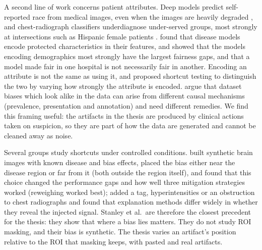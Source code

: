 \documentclass[11pt,a4paper]{article}
\begin{document}
A second line of work concerns patient attributes. Deep models predict self-reported race from medical images, even
when the images are heavily degraded \citep{gichoya2022race}, and chest-radiograph classifiers underdiagnose
under-served groups, most strongly at intersections such as Hispanic female patients
\citep{seyyedkalantari2021underdiagnosis}. \citet{glocker2023encoding} found that disease models encode protected
characteristics in their features, and \citet{yang2024limits} showed that the models encoding demographics most
strongly have the largest fairness gaps, and that a model made fair in one hospital is not necessarily fair in another.
Encoding an attribute is not the same as using it, and \citet{brown2023shortcut} proposed shortcut testing to
distinguish the two by varying how strongly the attribute is encoded. \citet{jones2024causal} argue that dataset biases
which look alike in the data can arise from different causal mechanisms (prevalence, presentation and annotation) and
need different remedies. We find this framing useful: the artifacts in the thesis are produced by clinical actions
taken on suspicion, so they are part of how the data are generated and cannot be cleaned away as noise.

Several groups study shortcuts under controlled conditions. \citet{stanley2024simba} built synthetic brain images with
known disease and bias effects, placed the bias either near the disease region or far from it (both outside the
region itself), and found that this choice changed the performance gaps and how well three mitigation strategies worked (reweighing worked best);
\citet{sun2023right} added a tag, hyperintensities or an obstruction to chest radiographs and found that explanation
methods differ widely in whether they reveal the injected signal. Stanley
et al.\ are therefore the closest precedent for the thesis: they show that where a bias lies matters. They do not study
ROI masking, and their bias is synthetic. The thesis varies an artifact's position relative to the ROI that masking keeps,
with pasted and real artifacts.
\end{document}

